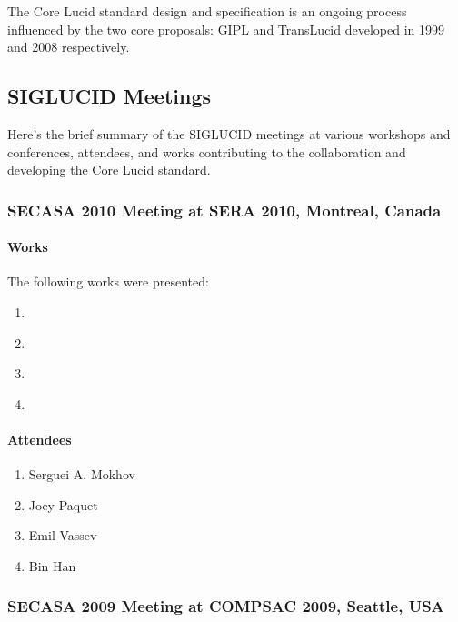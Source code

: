 \documentclass{easychair}
\newcommand{\gipl}{{GIPL\index{GIPL}}}
\newcommand{\translucid}{TransLucid\index{TransLucid}}
\newcommand{\todo}[0]
{
	{\Large }
}
\begin{document}
The Core Lucid standard design and specification is an ongoing process
influenced by the two core proposals: {\gipl} and {\translucid}
developed in 1999 and 2008 respectively.

\subsection{SIGLUCID Meetings}
\label{sect:siglucid-meetings}

Here's the brief summary of the SIGLUCID meetings at various workshops
and conferences, attendees, and works contributing to the collaboration
and developing the Core Lucid standard.

\subsubsection{SECASA 2010 Meeting at SERA 2010, Montreal, Canada}
\label{sect:meeting-notes-secasa2010}

\paragraph{Works}

The following works were presented:

\begin{enumerate}
	\item \cite{gipsy-multi-tier-impl}
	\item \cite{gipsy-type-system-hoil-theory}
	\item \cite{gipsy-jooip}
	\item \cite{gipsy-hoil}
\end{enumerate}

{\todo}

\paragraph{Attendees}

\begin{enumerate}
	\item Serguei A. Mokhov
	\item Joey Paquet
	\item Emil Vassev
	\item Bin Han
\end{enumerate}

{\todo}

\subsubsection{SECASA 2009 Meeting at COMPSAC 2009, Seattle, USA}
\label{sect:meeting-notes-secasa2009}
\end{document}
